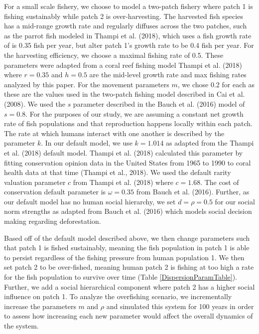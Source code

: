 \documentclass[
  12pt,
]{article}
\begin{document}
For a small scale fishery, we choose to model a two-patch fishery where patch 1 is fishing sustainably while patch 2 is over-harvesting. The harvested fish species has a mid-range growth rate and regularly diffuses across the two patches, such as the parrot fish modeled in Thampi et al. (2018), which uses a fish growth rate of is 0.35 fish per year, but alter patch 1's growth rate to be 0.4 fish per year. For the harvesting efficiency, we choose a maximal fishing rate of 0.5. These parameters were adapted from a coral reef fishing model Thampi et al. (2018) where \(r = 0.35\) and \(h = 0.5\) are the mid-level growth rate and max fishing rates analyzed by this paper. For the movement parameters \(m\), we chose 0.2 for each as these are the values used in the two-patch fishing model described in Cai et al. (2008). We used the \(s\) parameter described in the Bauch et al. (2016) model of \(s = 0.8\). For the purposes of our study, we are assuming a constant net growth rate of fish populations and that reproduction happens locally within each patch. The rate at which humans interact with one another is described by the parameter \(k\). In our default model, we use \(k = 1.014\) as adapted from the Thampi et al. (2018) default model. Thampi et al. (2018) calculated this parameter by fitting conservation opinion data in the United States from 1965 to 1990 to coral health data at that time (Thampi et al., 2018). We used the default rarity valuation parameter \(c\) from Thampi et al. (2018) where \(c = 1.68\). The cost of conservation default parameter is \(\omega = 0.35\) from Bauch et al. (2016). Further, as our default model has no human social hierarchy, we set \(d = \rho = 0.5\) for our social norm strengths as adapted from Bauch et al. (2016) which models social decision making regarding deforestation.

Based off of the default model described above, we then change parameters such that patch 1 is fished sustainably, meaning the fish population in patch 1 is able to persist regardless of the fishing pressure from human population 1. We then set patch 2 to be over-fished, meaning human patch 2 is fishing at too high a rate for the fish population to survive over time (Table \ref{DispersionParamTable}). Further, we add a social hierarchical component where patch 2 has a higher social influence on patch 1. To analyze the overfishing scenario, we incrementally increase the parameters \(m\) and \(\rho\) and simulated this system for 100 years in order to assess how increasing each new parameter would affect the overall dynamics of the system.
\end{document}
